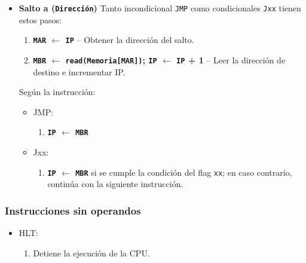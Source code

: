 \documentclass[12pt,oneside]{templates/unerthesis}
\providecommand{\tightlist}{%
  \setlength{\itemsep}{0pt}\setlength{\parskip}{0pt}}
\begin{document}
\begin{itemize}
\tightlist
\item
  \textbf{Salto a (\texttt{Dirección})}
  Tanto incondicional \texttt{JMP} como condicionales \texttt{Jxx} tienen estos pasos:

  \begin{enumerate}
  \def\labelenumi{\arabic{enumi}.}
  \setcounter{enumi}{3}
  \tightlist
  \item
    \textbf{\texttt{MAR} \(\leftarrow\) \texttt{IP}} -- Obtener la dirección del salto.
  \item
    \textbf{\texttt{MBR} \(\leftarrow\) \texttt{read(Memoria{[}MAR{]})}; \texttt{IP} \(\leftarrow\) \texttt{IP} + 1} -- Leer la dirección de destino e incrementar IP.
  \end{enumerate}

  Según la instrucción:

  \begin{itemize}
  \tightlist
  \item
    JMP:

    \begin{enumerate}
    \def\labelenumi{\arabic{enumi}.}
    \setcounter{enumi}{5}
    \tightlist
    \item
      \textbf{\texttt{IP} \(\leftarrow\) \texttt{MBR}}
    \end{enumerate}
  \item
    Jxx:

    \begin{enumerate}
    \def\labelenumi{\arabic{enumi}.}
    \setcounter{enumi}{5}
    \tightlist
    \item
      \textbf{\texttt{IP} \(\leftarrow\) \texttt{MBR}} si se cumple la condición del flag \texttt{xx}; en caso contrario, continúa con la siguiente instrucción.
    \end{enumerate}
  \end{itemize}
\end{itemize}

\hypertarget{instrucciones-sin-operandos}{%
\subsubsection{Instrucciones sin operandos}\label{instrucciones-sin-operandos}}

\begin{itemize}
\tightlist
\item
  HLT:

  \begin{enumerate}
  \def\labelenumi{\arabic{enumi}.}
  \setcounter{enumi}{3}
  \tightlist
  \item
    Detiene la ejecución de la CPU.
  \end{enumerate}
\end{itemize}
\end{document}
